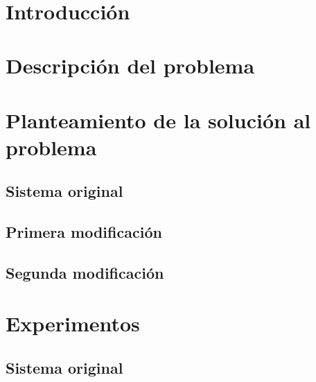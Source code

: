 \documentclass[12pt, spanish]{article}
\makeatletter
\let\thedate\@date
\makeatother
\begin{document}
\begin{titlepage}
    {\large \thedate}\\[0.5cm]
    {\doclicenseThis}

    \vfill

\end{titlepage}


\tableofcontents
\pagebreak



\section*{Introducción}


\section{Descripción del problema}


\section{Planteamiento de la solución al problema}

\subsection{Sistema original}

\subsection{Primera modificación}

\subsection{Segunda modificación}





\section{Experimentos}


\subsection{Sistema original}
\end{document}
